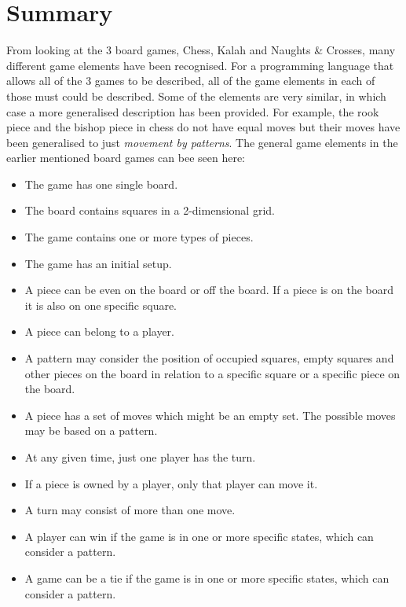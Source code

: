 
\section{Summary}
From looking at the 3 board games, Chess, Kalah and Naughts \& Crosses, many different game elements have been recognised. For a programming language that allows all of the 3 games to be described, all of the game elements in each of those must could be described. Some of the elements are very similar, in which case a more generalised description has been provided. For example, the rook piece and the bishop piece in chess do not have equal moves but their moves have been generalised to just \textit{movement by patterns}. The general game elements in the earlier mentioned board games can bee seen here:
\begin{itemize}
\item The game has one single board.
\item The board contains squares in a 2-dimensional grid.
\item The game contains one or more types of pieces.
\item The game has an initial setup.
\item A piece can be even on the board or off the board. If a piece is on the board it is also on one specific square.
\item A piece can belong to a player.
\item A pattern may consider the position of occupied squares, empty squares and other pieces on the board in relation to a specific square or a specific piece on the board.
\item A piece has a set of moves which might be an empty set. The possible moves may be based on a pattern.
\item At any given time, just one player has the turn.
\item If a piece is owned by a player, only that player can move it.
\item A turn may consist of more than one move.
\item A player can win if the game is in one or more specific states, which can consider a pattern.
\item A game can be a tie if the game is in one or more specific states, which can consider a pattern.
\end{itemize}

